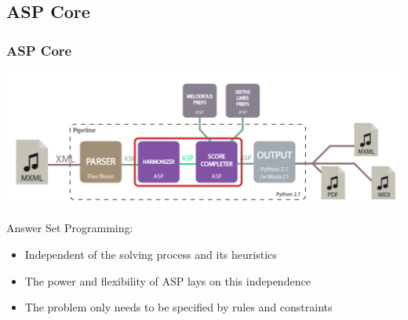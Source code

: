 \documentclass[english,handout]{beamer}
\begin{document}
\subsection{ASP Core}
	\begin{frame}[t]
		\frametitle{ASP Core}
		\begin{center}
		\includegraphics[width=0.6\linewidth]{imagenes/arch_trans/arquitectura_final_asp_core-01.png}
		\end{center}
		Answer Set Programming:
		\begin{itemize}
			\item \alert{Independent} of the solving process and its heuristics
			\item The power and \alert{flexibility} of ASP lays on this independence
			\item The problem only needs to be specified by \alert{rules and constraints}
		\end{itemize}
	\end{frame}
\end{document}
